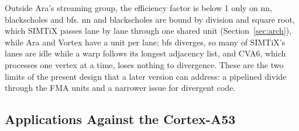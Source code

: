 \documentclass[journal]{IEEEtran}
\begin{document}
Outside Ara's streaming group, the efficiency factor is below 1 only on nn,
blackscholes and bfs. nn and blackscholes are bound by division and square root,
which SIMTiX passes lane by lane through one shared unit (Section~\ref{sec:arch}),
while Ara and Vortex have a unit per lane; bfs diverges, so many of SIMTiX's lanes
are idle while a warp follows its longest adjacency list, and CVA6, which processes
one vertex at a time, loses nothing to divergence. These are the two limits of the
present design that a later version can address: a pipelined divide through the FMA
units and a narrower issue for divergent code.

\subsection{Applications Against the Cortex-A53}\label{sec:evalboard}
\end{document}
